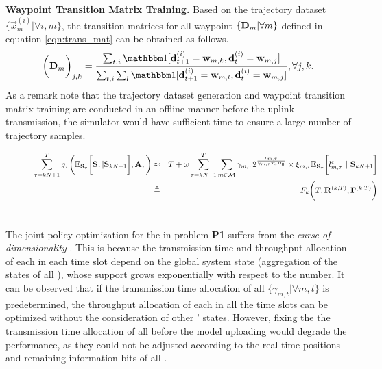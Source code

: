\textbf{Waypoint Transition Matrix Training.} Based on the trajectory dataset $ \{\vec{x}^{(i)}_{m} | \forall i,m\} $, the transition matrices for all {\IAVs} waypoint $\{\mathbf{D}_{m}| \forall m\}$ defined in equation \eqref{eqn:trans_mat} can be obtained as follows. 
\begin{align*}
    \Paren{\TransD_{m}}_{j,k} = 
        \frac{
            \sum_{t,i} \indicator\bracket{ \vec{d}^{(i)}_{t+1}=\vec{w}_{m,k}, \vec{d}^{(i)}_{t}=\vec{w}_{m,j} }
        }{
            \sum_{t,i}\sum_{l} \indicator \bracket{ \vec{d}^{(i)}_{t+1}=\vec{w}_{m,l}, \vec{d}^{(i)}_{t}=\vec{w}_{m,j} }
        }, \forall j,k.
\end{align*}
As a remark note that the trajectory dataset generation and waypoint transition matrix training are conducted in an offline manner before the uplink transmission, the {\fwName} simulator would have sufficient time to ensure a large number of trajectory samples. 

\begin{figure*}[t]
    \begin{eqnarray}
            \sum_{\tau=kN+1}^{T} g_{\tau}\bigg(
                \mathbb{E}_{\mathbf{S}_{\tau}} \bigg[ \mathbf{S}_{\tau} | \mathbf{S}_{kN+1} \bigg], \mathbf{A}_{\tau}
            \bigg) 
            &\approx&
            T + \omega \sum_{\tau=kN+1}^{T} \sum_{m\in\mathcal{M}} \gamma_{m,\tau}
            2^\frac{r_{m,\tau}}{\gamma_{m,\tau}T_s B_0} 
            \times \xi_{m,\tau} \mathbb{E}_{\mathbf{S}_{\tau}} \bigg[ l_{m,\tau}^{\epsilon}~|~\mathbf{S}_{kN+1} \bigg] \nonumber\\
            &\triangleq&    F_k\bigg( T, \mathbf{R}^{(k,T)}, \mathbf{\Gamma}^{(k,T)} \bigg)
            \label{eqn:fk}
    \end{eqnarray}
    \hrulefill
\end{figure*}

\section{}
\label{sec:new_framework}

The joint policy optimization for the {\IAVs} in problem {\bf P1} suffers from the {\it curse of dimensionality} \cite{mdp-huang,mdp-lv}.
This is because the transmission time and throughput allocation of each {\IAV} in each time slot depend on the global system state (aggregation of the states of all {\IAVs}), whose support grows exponentially with respect to the {\IAV} number. It can be observed that if the transmission time allocation of all {\IAVs} $\{\gamma_{m,t}|\forall m,t\}$ is predetermined, the throughput allocation of each {\IAV} in all the time slots can be optimized without the consideration of other {\IAVs}' states. However, fixing the the transmission time allocation of all {\IAVs} before the model uploading would degrade the performance, as they could not be adjusted according to the real-time positions and remaining information bits of all {\IAVs}.

